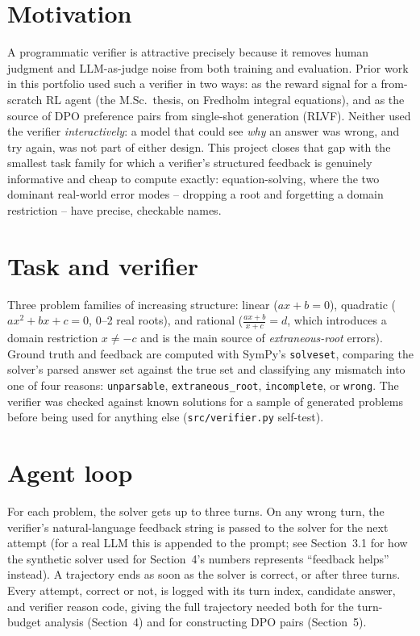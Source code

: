 \documentclass[11pt]{article}
\begin{document}
\section{Motivation}
A programmatic verifier is attractive precisely because it removes human
judgment and LLM-as-judge noise from both training and evaluation. Prior
work in this portfolio used such a verifier in two ways: as the reward
signal for a from-scratch RL agent (the M.Sc.\ thesis, on Fredholm
integral equations), and as the source of DPO preference pairs from
single-shot generation (RLVF). Neither used the verifier
\emph{interactively}: a model that could see \emph{why} an answer was
wrong, and try again, was not part of either design. This project closes
that gap with the smallest task family for which a verifier's structured
feedback is genuinely informative and cheap to compute exactly:
equation-solving, where the two dominant real-world error modes --
dropping a root and forgetting a domain restriction -- have precise,
checkable names.

\section{Task and verifier}
Three problem families of increasing structure: linear ($ax+b=0$),
quadratic ($ax^2+bx+c=0$, 0--2 real roots), and rational
($\frac{ax+b}{x+c}=d$, which introduces a domain restriction $x\neq -c$
and is the main source of \emph{extraneous-root} errors). Ground truth and
feedback are computed with SymPy's \texttt{solveset}, comparing the
solver's parsed answer set against the true set and classifying any
mismatch into one of four reasons: \texttt{unparsable},
\texttt{extraneous\_root}, \texttt{incomplete}, or \texttt{wrong}. The
verifier was checked against known solutions for a sample of generated
problems before being used for anything else (\texttt{src/verifier.py}
self-test).

\section{Agent loop}
For each problem, the solver gets up to three turns. On any wrong turn,
the verifier's natural-language feedback string is passed to the solver
for the next attempt (for a real LLM this is appended to the prompt; see
Section~3.1 for how the synthetic solver used for Section~4's numbers
represents ``feedback helps'' instead). A trajectory ends as soon as the
solver is correct, or after three turns. Every attempt, correct or not, is
logged with its turn index, candidate answer, and verifier reason code,
giving the full trajectory needed both for the turn-budget analysis
(Section~4) and for constructing DPO pairs (Section~5).
\end{document}
